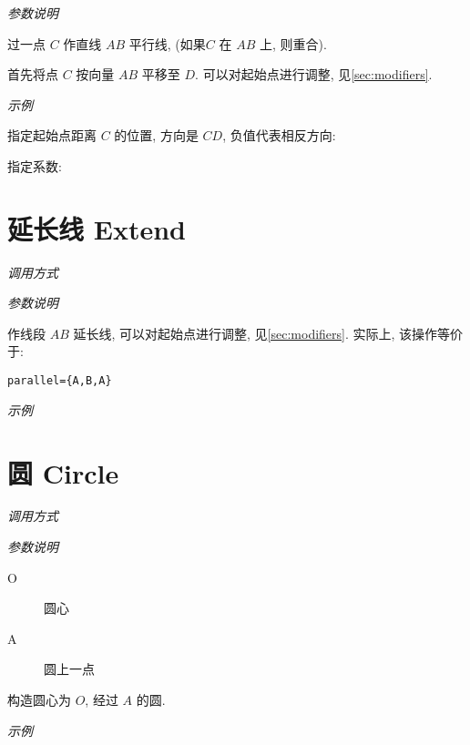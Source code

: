\emph{参数说明}

过一点 $C$ 作直线 $AB$ 平行线, (如果$C$ 在 $AB$ 上, 则重合).

首先将点 $C$ 按向量 $AB$ 平移至 $D$. 
可以对起始点进行调整, 见\ref{sec:modifiers}.

\emph{示例}

指定起始点距离 $C$ 的位置, 方向是 $CD$, 负值代表相反方向:


指定系数:


\section{延长线 Extend}

\emph{调用方式}

\begin{tcolorbox}{}
\end{tcolorbox}

\emph{参数说明}

作线段 $AB$ 延长线,
可以对起始点进行调整, 见\ref{sec:modifiers}.
实际上, 该操作等价于:

\begin{verbatim}
parallel={A,B,A}
\end{verbatim}

\emph{示例}


\section{圆 Circle}

\emph{调用方式}

\begin{tcolorbox}{}
\end{tcolorbox}

\emph{参数说明}

\begin{description}
  \item[O] 圆心
  \item[A] 圆上一点
\end{description}

构造圆心为 $O$, 经过 $A$ 的圆.

\emph{示例}

